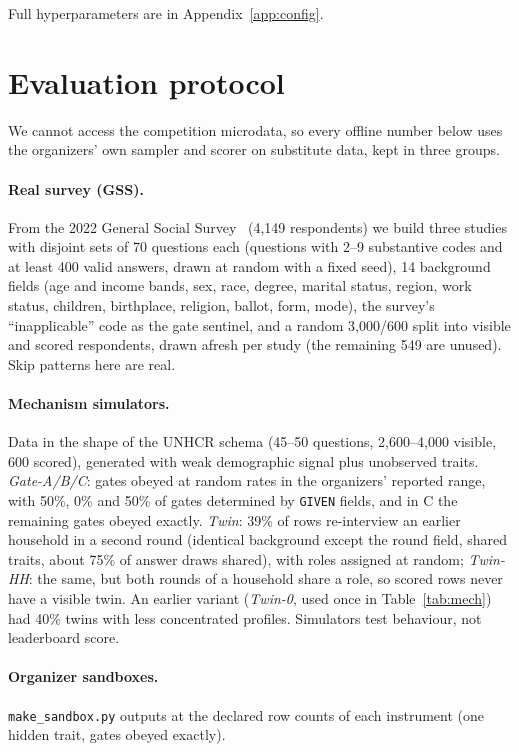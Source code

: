 \documentclass[10pt]{article}
\begin{document}
Full hyperparameters are in Appendix~\ref{app:config}.

\section{Evaluation protocol}
\label{sec:protocol}

We cannot access the competition microdata, so every offline number below uses the organizers' own sampler and scorer on substitute data, kept in three groups.

\paragraph{Real survey (GSS).} From the 2022 General Social Survey~\citep{gss2022} (4,149 respondents) we build three studies with disjoint sets of 70 questions each (questions with 2--9 substantive codes and at least 400 valid answers, drawn at random with a fixed seed), 14 background fields (age and income bands, sex, race, degree, marital status, region, work status, children, birthplace, religion, ballot, form, mode), the survey's ``inapplicable'' code as the gate sentinel, and a random 3,000/600 split into visible and scored respondents, drawn afresh per study (the remaining 549 are unused). Skip patterns here are real.

\paragraph{Mechanism simulators.} Data in the shape of the UNHCR schema (45--50 questions, 2,600--4,000 visible, 600 scored), generated with weak demographic signal plus unobserved traits. \emph{Gate-A/B/C}: gates obeyed at random rates in the organizers' reported range, with 50\%, 0\% and 50\% of gates determined by \texttt{GIVEN} fields, and in C the remaining gates obeyed exactly. \emph{Twin}: 39\% of rows re-interview an earlier household in a second round (identical background except the round field, shared traits, about 75\% of answer draws shared), with roles assigned at random; \emph{Twin-HH}: the same, but both rounds of a household share a role, so scored rows never have a visible twin. An earlier variant (\emph{Twin-0}, used once in Table~\ref{tab:mech}) had 40\% twins with less concentrated profiles. Simulators test behaviour, not leaderboard score.

\paragraph{Organizer sandboxes.} \texttt{make\_sandbox.py} outputs at the declared row counts of each instrument (one hidden trait, gates obeyed exactly).
\end{document}
